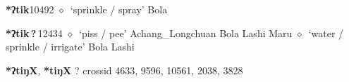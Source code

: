   \begin{list}{}{\leftmargin=1.5em \itemindent=-1.5em}
  \item {\footnotesize \textbf{*ʔtik}}{\tiny 10492}
         $\diamond$~`sprinkle / spray'
         Bola 
  \item {\footnotesize \textbf{*ʔtik\,?\,}}{\tiny 12434}
\hspace{1ex}
         $\diamond$~`piss / pee'
         Achang\_Longchuan 
\hspace{1ex}
         Bola 
\hspace{1ex}
         Lashi 
\hspace{1ex}
         Maru 
\hspace{1ex}
         $\diamond$~`water / sprinkle / irrigate'
         Bola 
\hspace{1ex}
         Lashi 
  \end{list}
\item
\textbf{*ʔtiŋX}, \textbf{*tiŋX}
?
  {\tiny crossid 4633, 9596, 10561, 2038, 3828}

